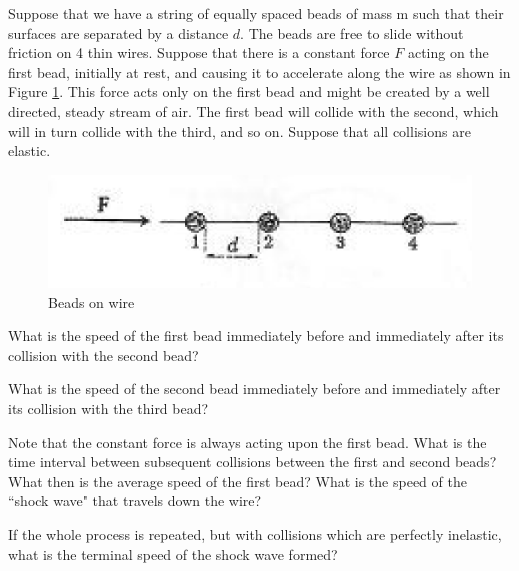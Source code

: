 \begin{problem}
    Suppose that we have a string of equally spaced beads of mass m such that their surfaces are separated by a distance $d$. The beads are free to slide without friction on 4 thin wires. Suppose that there is a constant force $F$ acting on the first bead, initially at rest, and causing it to accelerate along the wire as shown in Figure \ref{2011q3}. This force acts only on the first bead and might be created by a well directed, steady stream of air. The first bead will collide with the second, which will in turn collide with the third, and so on. Suppose that all collisions are elastic.
    \begin{figure}[h]
	    \centering
	    \includegraphics[width=0.7\linewidth]{spho_book_TYS_images/2011q3.png}
	    \caption{Beads on wire} \label{2011q3}
    \end{figure}
    \begin{subproblem}
        What is the speed of the first bead immediately before and immediately after its collision with the second bead?
    \end{subproblem}

    \begin{subproblem}
        What is the speed of the second bead immediately before and immediately after its collision with the third bead?
    \end{subproblem}

    \begin{subproblem}
        Note that the constant force is always acting upon the first bead. What is the time interval between subsequent collisions between the first and second beads? What then is the average speed of the first bead? What is the speed of the “shock wave" that travels down the wire?
    \end{subproblem}

    \begin{subproblem}
        If the whole process is repeated, but with collisions which are perfectly inelastic, what is the terminal speed of the shock wave formed?
    \end{subproblem}
\end{problem}

